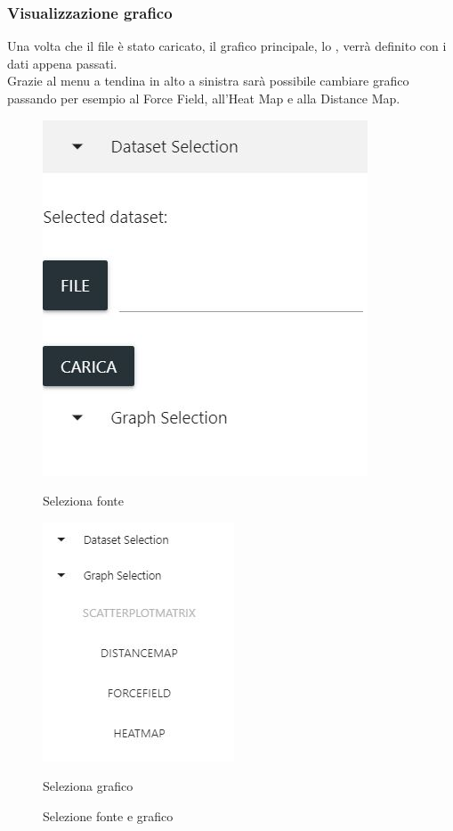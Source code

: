 \documentclass[../manuale_utente.tex]{subfiles}
\begin{document}
\subsubsection{Visualizzazione grafico}
    \label{subsub:vis_graf}
Una volta che il file è stato caricato, il grafico principale, lo , verrà definito con i dati appena passati. \\
Grazie al menu a tendina in alto a sinistra sarà possibile cambiare grafico passando per esempio al Force Field, all’Heat Map e alla Distance Map.

\begin{figure}
	\centering
	\begin{minipage}{.5\textwidth}
	  \centering
	  \includegraphics[width=.5\linewidth]{src/img/seleziona_dataset.jpg}
	  \caption{Seleziona fonte}
	  \label{fig:sub1}
	\end{minipage}%
	\begin{minipage}{.5\textwidth}
	  \centering
	  \includegraphics[width=.5\linewidth]{src/img/seleziona_grafico.jpg}
	  \caption{Seleziona grafico}
	  \label{fig:sub2}
	\end{minipage}
	\caption{Selezione fonte e grafico}
	\label{fig:test}
\end{figure}
\end{document}
